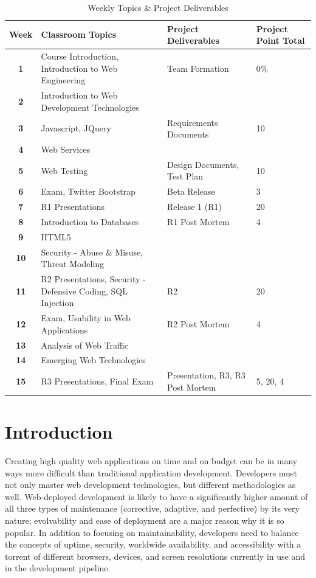 \documentclass[conference]{IEEEtran}
\begin{document}
\begin{table}[t]
  \centering
  \caption{Weekly Topics \& Project Deliverables}
     \begin{tabular}{ c | l | l | l}
 \bfseries Week & \bfseries Classroom Topics & \bfseries Project Deliverables & \bfseries Project Point Total  \\ \hline \hline
	\bfseries 1 & Course Introduction, Introduction to Web Engineering & Team Formation & 0\%\\ \hline
	\bfseries 2 & Introduction to Web Development Technologies & \\ \hline
	\bfseries 3 & Javascript, JQuery & Requirements Documents & 10\\ \hline
	\bfseries 4 & Web Services & \\ \hline
	\bfseries 5 & Web Testing & Design Documents, Test Plan & 10\\ \hline
	\bfseries 6 & Exam, Twitter Bootstrap & Beta Release & 3\\ \hline
	\bfseries 7 & R1 Presentations & Release 1 (R1) & 20\\ \hline
	\bfseries 8 & Introduction to Databases & R1 Post Mortem & 4\\ \hline
	\bfseries 9 & HTML5 & \\ \hline
	\bfseries 10 & Security - Abuse \& Misuse,  Threat Modeling& \\ \hline
	\bfseries 11 & R2 Presentations,  Security - Defensive Coding, SQL Injection & R2 & 20\\ \hline
	\bfseries 12 & Exam, Usability in Web Applications & R2 Post Mortem & 4\\ \hline
	\bfseries 13 & Analysis of Web Traffic & \\ \hline
	\bfseries 14 & Emerging Web Technologies & \\ \hline
	\bfseries 15 & R3 Presentations, Final Exam & Presentation, R3, R3 Post Mortem & 5, 20, 4\\
  \end{tabular}
  \label{table:weeklytopics}

\end{table}

\section{Introduction}

Creating high quality web applications on time and on budget can be in many ways more difficult than traditional application development. Developers must not only master web development technologies, but different methodologies as well. Web-deployed development is likely to have a significantly higher amount of all three types of maintenance (corrective, adaptive, and perfective) by its very nature; evolvability and ease of deployment are a major reason why it is so popular. In addition to focusing on maintainability, developers need to balance the concepts of uptime, security, worldwide availability, and accessibility with a torrent of different browsers, devices, and screen resolutions currently in use and in the development pipeline.
\end{document}
